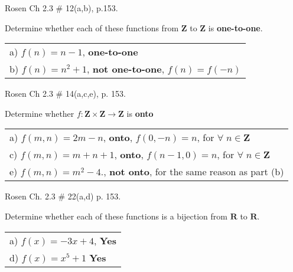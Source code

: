 \documentclass[11pt]{exam}
\begin{document}
\begin{questions}
\question[4] Rosen Ch 2.3 \# 12(a,b), p.153.  %
\begin{solution}
Determine whether each of these functions from $\mathbf{Z}$ to $\mathbf{Z}$ is \textbf{one-to-one}.

\begin{tabular}{l}
 a) $f(n) = n-1$, \textbf{one-to-one} \\
 b) $f(n) = n^2 + 1$, \textbf{not one-to-one}, $f(n) = f(-n)$\\
\end{tabular}
\end{solution}



\question[6] Rosen Ch 2.3 \# 14(a,c,e), p. 153.  %
\begin{solution}
Determine whether $f: \mathbf{Z} \times \mathbf{Z} \rightarrow \mathbf{Z}$ is \textbf{onto}

\begin{tabular}{p{5in}}
  a) $f(m,n) = 2m - n$, \textbf{onto}, $f(0,-n) = n$, for $\forall\;n \in \mathbf{Z}$ \\
  c) $f(m,n) = m + n + 1$, \textbf{onto}, $f(n-1,0) = n$, for $\forall\;n \in \mathbf{Z}$ \\
  e) $f(m,n) = m^2 - 4.$, \textbf{not onto}, for the same reason as part (b) \\
\end{tabular}
\end{solution}



\question[4] Rosen Ch. 2.3 \# 22(a,d) p. 153.  %
\begin{solution}
Determine whether each of these functions is a bijection from $\mathbf{R}$ to $\mathbf{R}$.

\begin{tabular}{l}
 a) $ f(x) = -3x + 4$, \textbf{Yes} \\
 d) $f(x) = x^5 + 1$ \textbf{Yes} \\
\end{tabular}
\end{solution}




\end{questions}
\end{document}
